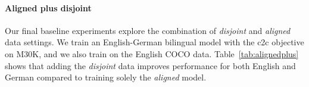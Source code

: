 \paragraph{Aligned plus disjoint}
\begin{comment}

\begin{table}[t]
    \centering
    \renewcommand{\arraystretch}{1.0}
    \begin{tabular}{lccc}
        \toprule
         & \multicolumn{3}{c}{English}\\
         & I $\rightarrow$ T & T $\rightarrow$ I & Sum\\
         \midrule
         En+De+c2c & 42.8 & 28.6 & 361.6 \\
         \; + COCO & \textbf{46.5} & \textbf{34.8} &  \textbf{378.9}\\
         \bottomrule
    \end{tabular}
    \caption{Recall @ 1 and Sum-of-Recall-Scores for Image-to-Text (I$\rightarrow$T) and 
    Text-to-Image (T$\rightarrow$I) baseline results on the English
    M30K 2016 test set for models in the \emph{aligned plus disjoint} setting: 
    M30K German-English model with c2c loss  ( En+De+c2c) and the same model with CO (+COCO)}\label{tab:engalignedplus}
\end{table}


\begin{table}[ht]
    \centering
    \renewcommand{\arraystretch}{1.0}
    \begin{tabular}{lccc}
        \toprule
         & \multicolumn{3}{c}{English}\\
         & I $\rightarrow$ T & T $\rightarrow$ I & Sum\\
         \midrule
        En+De+c2c & 38.3 & 27.7 & 334.0 \\
         \; + COCO & \textbf{40.6} & \textbf{28.8} & \textbf{344.6} \\
             \bottomrule
    \end{tabular}
    \caption{Recall @ 1 Image-to-Text and Text-to-Image baseline results  on the German
    M30K 2016 test set.}\label{tab:geralignedplus}
\end{table}
\end{comment}


Our final baseline experiments explore the combination of 
\emph{disjoint} and \emph{aligned} data settings. We train an English-German bilingual model with the c2c
objective on M30K, and we also train on the English COCO data. Table~\ref{tab:alignedplus} shows that adding the 
\emph{disjoint} data improves performance for
both English and German compared to training 
solely the \emph{aligned} model. 

